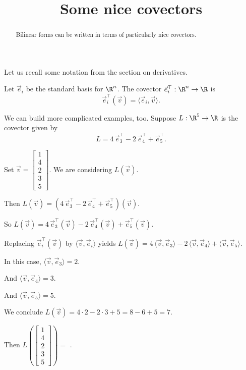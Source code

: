 \documentclass{ximera}
\title{Some nice covectors}
\begin{document}
\begin{abstract}
  Bilinear forms can be written in terms of particularly nice covectors.
\end{abstract}	

Let us recall some notation from the section on derivatives.
	
Let $\vec{e}_i$ be the standard basis for $\R^n$.  The covector $\vec{e}_i^\top : \R^n \to \R$ is 
$$
\vec{e}_i^\top(\vec{v}) = \langle \vec{e}_i, \vec{v} \rangle.
$$
\begin{question}
  We can build more complicated examples, too.  Suppose $L : \R^5 \to \R$ is the covector given by
  $$
  L = 4 \, \vec{e}_3^\top - 2 \, \vec{e}_4^\top + \vec{e}_5^\top.
  $$
  \begin{solution}
    \begin{hint}
      Set $\vec{v} = \begin{bmatrix} 1 \\ 4 \\ 2 \\ 3 \\ 5 \end{bmatrix}$.  We are considering $L(\vec{v})$.
    \end{hint}
    \begin{hint}
      Then $L(\vec{v}) = (4 \, \vec{e}_3^\top - 2 \, \vec{e}_4^\top + \vec{e}_5^\top)(\vec{v})$.
    \end{hint}
    \begin{hint}
      So $L(\vec{v}) = 4 \, \vec{e}_3^\top(\vec{v}) - 2 \, \vec{e}_4^\top(\vec{v}) + \vec{e}_5^\top(\vec{v})$.
    \end{hint}
    \begin{hint}
      Replacing $\vec{e}_i^\top(\vec{v})$ by $\langle \vec{v}, \vec{e}_i \rangle$ yields $L(\vec{v}) = 4 \, \langle \vec{v}, \vec{e}_3 \rangle - 2 \, \langle \vec{v}, \vec{e}_4 \rangle + \langle \vec{v}, \vec{e}_5 \rangle$.
    \end{hint}
    \begin{hint}
      In this case, $\langle \vec{v}, \vec{e}_3 \rangle = 2$.
    \end{hint}
    \begin{hint}
      And $\langle \vec{v}, \vec{e}_4 \rangle = 3$.
    \end{hint}
    \begin{hint}
      And $\langle \vec{v}, \vec{e}_5 \rangle = 5$.
    \end{hint}
    \begin{hint}
      We conclude $L(\vec{v}) = 4 \cdot 2 - 2 \cdot 3 + 5 = 8 - 6 + 5 = 7$.
    \end{hint}
    Then $L\left( \begin{bmatrix} 1 \\ 4 \\ 2 \\ 3 \\ 5 \end{bmatrix} \right) = $ .
  \end{solution}


\end{question}
\end{document}
